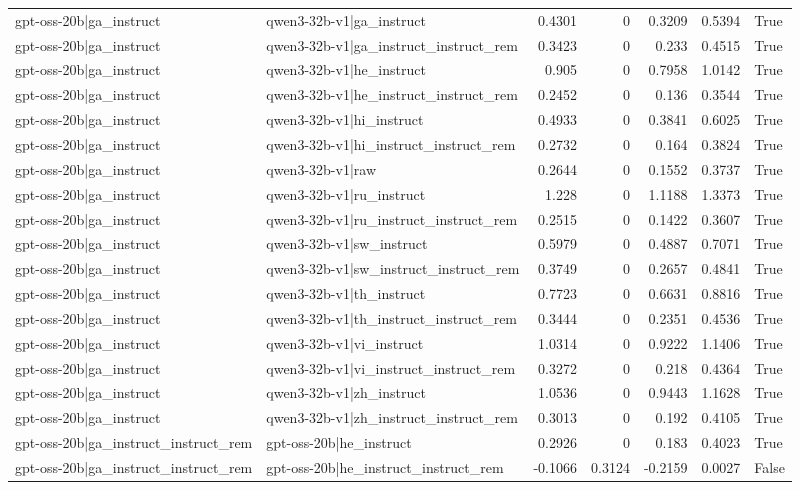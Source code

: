 \begin{table}
\begin{tabular}{l l r r r r l}
gpt-oss-20b|ga_instruct & qwen3-32b-v1|ga_instruct & 0.4301 & 0 & 0.3209 & 0.5394 & True \\
gpt-oss-20b|ga_instruct & qwen3-32b-v1|ga_instruct_instruct_rem & 0.3423 & 0 & 0.233 & 0.4515 & True \\
gpt-oss-20b|ga_instruct & qwen3-32b-v1|he_instruct & 0.905 & 0 & 0.7958 & 1.0142 & True \\
gpt-oss-20b|ga_instruct & qwen3-32b-v1|he_instruct_instruct_rem & 0.2452 & 0 & 0.136 & 0.3544 & True \\
gpt-oss-20b|ga_instruct & qwen3-32b-v1|hi_instruct & 0.4933 & 0 & 0.3841 & 0.6025 & True \\
gpt-oss-20b|ga_instruct & qwen3-32b-v1|hi_instruct_instruct_rem & 0.2732 & 0 & 0.164 & 0.3824 & True \\
gpt-oss-20b|ga_instruct & qwen3-32b-v1|raw & 0.2644 & 0 & 0.1552 & 0.3737 & True \\
gpt-oss-20b|ga_instruct & qwen3-32b-v1|ru_instruct & 1.228 & 0 & 1.1188 & 1.3373 & True \\
gpt-oss-20b|ga_instruct & qwen3-32b-v1|ru_instruct_instruct_rem & 0.2515 & 0 & 0.1422 & 0.3607 & True \\
gpt-oss-20b|ga_instruct & qwen3-32b-v1|sw_instruct & 0.5979 & 0 & 0.4887 & 0.7071 & True \\
gpt-oss-20b|ga_instruct & qwen3-32b-v1|sw_instruct_instruct_rem & 0.3749 & 0 & 0.2657 & 0.4841 & True \\
gpt-oss-20b|ga_instruct & qwen3-32b-v1|th_instruct & 0.7723 & 0 & 0.6631 & 0.8816 & True \\
gpt-oss-20b|ga_instruct & qwen3-32b-v1|th_instruct_instruct_rem & 0.3444 & 0 & 0.2351 & 0.4536 & True \\
gpt-oss-20b|ga_instruct & qwen3-32b-v1|vi_instruct & 1.0314 & 0 & 0.9222 & 1.1406 & True \\
gpt-oss-20b|ga_instruct & qwen3-32b-v1|vi_instruct_instruct_rem & 0.3272 & 0 & 0.218 & 0.4364 & True \\
gpt-oss-20b|ga_instruct & qwen3-32b-v1|zh_instruct & 1.0536 & 0 & 0.9443 & 1.1628 & True \\
gpt-oss-20b|ga_instruct & qwen3-32b-v1|zh_instruct_instruct_rem & 0.3013 & 0 & 0.192 & 0.4105 & True \\
gpt-oss-20b|ga_instruct_instruct_rem & gpt-oss-20b|he_instruct & 0.2926 & 0 & 0.183 & 0.4023 & True \\
gpt-oss-20b|ga_instruct_instruct_rem & gpt-oss-20b|he_instruct_instruct_rem & -0.1066 & 0.3124 & -0.2159 & 0.0027 & False \\

\end{tabular}
\end{table}

